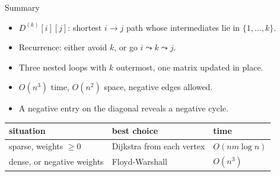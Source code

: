 \documentclass[10pt,aspectratio=169,xcolor=table]{beamer}
\begin{document}
\begin{frame}{Summary}
  \begin{itemize}
    \item $D^{(k)}[i][j]$: shortest $i \to j$ path whose intermediates lie in
          $\{1, \ldots, k\}$.
    \item Recurrence: either avoid $k$, or go $i \leadsto k \leadsto j$.
    \item Three nested loops with $k$ outermost, one matrix updated in place.
    \item $O(n^3)$ time, $O(n^2)$ space, negative edges allowed.
    \item A negative entry on the diagonal reveals a negative cycle.
  \end{itemize}

  \bigskip
  \begin{center}
  \begin{tabular}{lll}
    \toprule
    situation & best choice & time \\
    \midrule
    sparse, weights $\ge 0$ & Dijkstra from each vertex & $O(nm \log n)$ \\
    dense, or negative weights & Floyd-Warshall & $O(n^3)$ \\
    \bottomrule
  \end{tabular}
  \end{center}
\end{frame}
\end{document}

